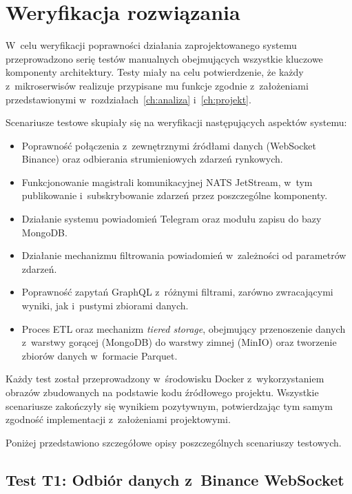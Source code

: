 \chapter{Weryfikacja rozwiązania}
\label{ch:testy}

W~celu weryfikacji poprawności działania zaprojektowanego systemu przeprowadzono serię testów manualnych obejmujących
wszystkie kluczowe komponenty architektury.
Testy miały na celu potwierdzenie, że każdy z~mikroserwisów realizuje przypisane mu funkcje zgodnie z~założeniami
przedstawionymi w~rozdziałach~\ref{ch:analiza} i~\ref{ch:projekt}.

Scenariusze testowe skupiały się na weryfikacji następujących aspektów systemu:
\begin{itemize}
    \item Poprawność połączenia z~zewnętrznymi źródłami danych (WebSocket Binance) oraz odbierania strumieniowych
    zdarzeń rynkowych.
    \item Funkcjonowanie magistrali komunikacyjnej NATS JetStream, w~tym publikowanie i~subskrybowanie zdarzeń przez
    poszczególne komponenty.
    \item Działanie systemu powiadomień Telegram oraz modułu zapisu do bazy MongoDB\@.
    \item Działanie mechanizmu filtrowania powiadomień w~zależności od parametrów zdarzeń.
    \item Poprawność zapytań GraphQL z~różnymi filtrami, zarówno zwracającymi wyniki, jak i~pustymi zbiorami danych.
    \item Proces ETL oraz mechanizm \textit{tiered storage}, obejmujący przenoszenie danych z~warstwy gorącej
    (MongoDB) do warstwy zimnej (MinIO) oraz tworzenie zbiorów danych w~formacie Parquet.
\end{itemize}

Każdy test został przeprowadzony w~środowisku Docker z~wykorzystaniem obrazów zbudowanych na podstawie kodu źródłowego
projektu.
Wszystkie scenariusze zakończyły się wynikiem pozytywnym, potwierdzając tym samym zgodność implementacji z~założeniami
projektowymi.

Poniżej przedstawiono szczegółowe opisy poszczególnych scenariuszy testowych.


\newpage


\section[Test T1: Odbiór danych z Binance WebSocket]{Test T1: Odbiór danych z~Binance WebSocket}
\label{sec:test_binance_websocket}

